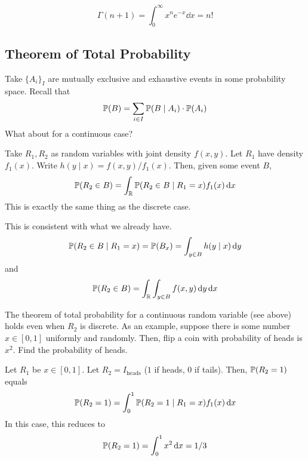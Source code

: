 \begin{aside}
    $$\Gamma(n+1) = \int_0^\infty x^n e^{-x} \dd{x} = n!$$
\end{aside}

\subsection{Theorem of Total Probability}
Take $\{ A_i \}_I$ are mutually exclusive and exhaustive events in some probability space. Recall that
\begin{align}
    \mathbb{P}(B) = \sum_{i \in I} \mathbb{P}(B \mid A_i) \cdot \mathbb{P}(A_i)
\end{align}
What about for a continuous case?
\begin{definition}
    Take $R_1,R_2$ as random variables with joint density $f(x,y)$. Let $R_1$ have density $f_1(x)$. Write $h(y \mid x) = f(x,y)/f_1(x)$. Then, given some event $B$,
    \begin{align}
        \mathbb{P}(R_2 \in B) = \int_{\mathbb{R}} \mathbb{P}(R_2 \in B \mid R_1 = x) f_1(x) \dd{x}
    \end{align}
    This is exactly the same thing as the discrete case.
\end{definition}
This is consistent with what we already have.
\begin{align}
    \mathbb{P}(R_2 \in B \mid R_1 = x) = \mathbb{P}(B_x) = \int_{y \in B} h(y \mid x) \dd{y}
\end{align}
and
\begin{align}
    \mathbb{P}(R_2 \in B) = \int_{\mathbb{R}} \int_{y \in B} f(x,y) \dd{y} \dd{x}
\end{align}
\begin{aside}
    The theorem of total probability for a continuous random variable (see above) holds even when $R_2$ is discrete. As an example, suppose there is some number $x \in [0, 1]$ uniformly and randomly. Then, flip a coin with probability of heads is $x^2$. Find the probability of heads.
\end{aside}
\begin{solution}
    Let $R_1$ be $x \in [0,1]$. Let $R_2 = I_\text{heads}$ ($1$ if heads, $0$ if tails). Then, $\mathbb{P}(R_2 = 1)$ equals
    \begin{align}
        \mathbb{P}(R_2 = 1) = \int_0^1 \mathbb{P}(R_2 = 1 \mid R_1 = x) f_1(x) \dd{x}
    \end{align}
    In this case, this reduces to
    \begin{align}
        \mathbb{P}(R_2 = 1) = \int_0^1 x^2 \dd{x} = 1/3
    \end{align}
\end{solution}

